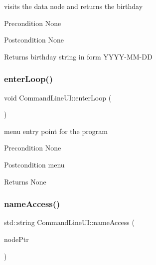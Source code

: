 visits the data node and returns the birthday \begin{DoxyPrecond}{Precondition}
None 
\end{DoxyPrecond}
\begin{DoxyPostcond}{Postcondition}
None 
\end{DoxyPostcond}
\begin{DoxyReturn}{Returns}
birthday string in form Y\+Y\+Y\+Y-\/\+M\+M-\/\+DD 
\end{DoxyReturn}
\mbox{\label{class_command_line_u_i_ac72a09121b78bdf1ab1f457795fcf370}} 
\subsubsection{\texorpdfstring{enter\+Loop()}{enterLoop()}}
{\footnotesize\ttfamily void Command\+Line\+U\+I\+::enter\+Loop (\begin{DoxyParamCaption}{ }\end{DoxyParamCaption})\hspace{0.3cm}{\ttfamily [static]}}

menu entry point for the program \begin{DoxyPrecond}{Precondition}
None 
\end{DoxyPrecond}
\begin{DoxyPostcond}{Postcondition}
menu 
\end{DoxyPostcond}
\begin{DoxyReturn}{Returns}
None 
\end{DoxyReturn}
\mbox{\label{class_command_line_u_i_a85f5fd4dd9358309be8b400bb9acb9a1}} 
\subsubsection{\texorpdfstring{name\+Access()}{nameAccess()}}
{\footnotesize\ttfamily std\+::string Command\+Line\+U\+I\+::name\+Access (\begin{DoxyParamCaption}\item[{\hyperlink{class_node_main}{Node\+Main} $\ast$}]{node\+Ptr }\end{DoxyParamCaption})\hspace{0.3cm}{\ttfamily [static]}}

